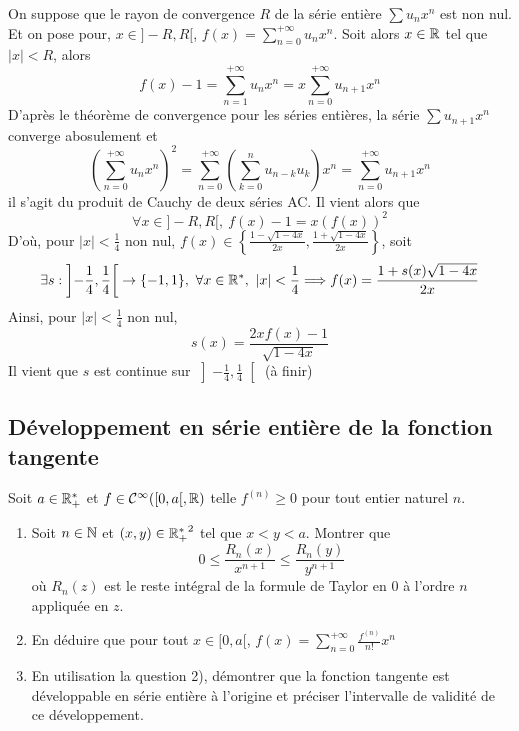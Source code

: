 \begin{sol}
On suppose que le rayon de convergence $R$ de la série entière $\sum u_nx^n$ est non nul. Et on pose pour, $x\in]-R,R[$, $f(x)=\displaystyle\sum_{n=0}^{+\infty}u_nx^n$. Soit alors $x\in\mathbb{R}$ tel que $|x|<R$, alors \[f(x)-1=\sum_{n=1}^{+\infty}u_nx^n=x\sum_{n=0}^{+\infty}u_{n+1}x^n\]
D'après le théorème de convergence pour les séries entières, la série $\sum u_{n+1}x^n$ converge abosulement et \[\left(\sum_{n=0}^{+\infty}u_nx^n\right)^2=\sum_{n=0}^{+\infty}\left(\sum_{k=0}^nu_{n-k}u_k\right)x^n=\sum_{n=0}^{+\infty}u_{n+1}x^n\]
il s'agit du produit de Cauchy de deux séries AC. Il vient alors que \[\forall x\in]-R,R[,\ f(x)-1=x(f(x))^2\]
D'où, pour $|x|<\frac14$ non nul, $f(x)\in\left\lbrace \frac{1-\sqrt{1-4x}}{2x},\frac{1+\sqrt{1-4x}}{2x}\right\rbrace$, soit \[\exists s:\left]-\frac14,\frac14\right[\to\lbrace-1,1\rbrace,\ \forall x\in\mathbb{R}^*,\ |x|<\frac14\Longrightarrow f(x)=\frac{1+s(x)\sqrt{1-4x}}{2x}\]
Ainsi, pour $|x|<\frac14$ non nul, \[s(x)=\frac{2xf(x)-1}{\sqrt{1-4x}}\]
Il vient que $s$ est continue sur $\left]-\frac14,\frac14\right[$ (à finir)
\end{sol}

\subsection{Développement en série entière de la fonction tangente}
\begin{exo}
	Soit $a\in{\mathbb{R}_+^*}$ et $f\in\mathcal C^\infty([0, a[,\mathbb{R})$ telle $f^{(n)}\geq 0$ pour tout entier naturel $n$.
	\begin{enumerate}
		\item Soit $n\in\mathbb{N}$ et $(x,y)\in{\mathbb{R}_+^*}^2$ tel que $x < y < a$. Montrer que \[0\leq \frac{R_n(x)}{x^{n+1}}\leq \frac{R_n(y)}{y^{n+1}}\]
		où $R_n(z)$ est le reste intégral de la formule de Taylor en $0$ à l'ordre $n$ appliquée en $z$.
		\item En déduire que pour tout $x\in[0,a[$, $f(x)=\sum_{n=0}^{+\infty}\frac{f^{(n)}}{n!}x^n$
		\item En utilisation la question 2), démontrer que la fonction tangente est développable en série entière à l'origine et préciser l'intervalle de validité de ce développement.
	\end{enumerate}
\end{exo}

\begin{sol}
	[À rédiger]
\end{sol}


